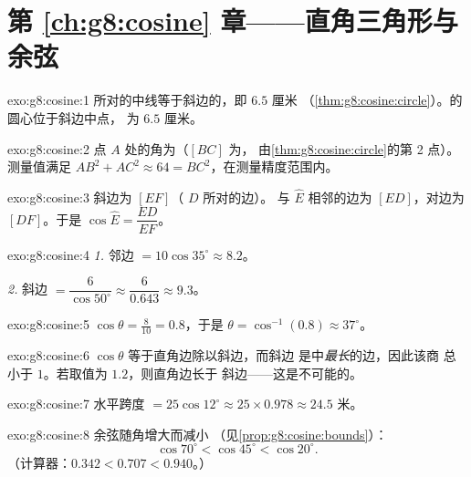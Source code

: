 \section*{第 \ref{ch:g8:cosine} 章——直角三角形与余弦}

\begin{solution}{exo:g8:cosine:1}
所对的中线等于斜边的，即 $6.5$ 厘米
（\cref{thm:g8:cosine:circle}）。的圆心位于斜边中点，
为 $6.5$ 厘米。
\end{solution}

\begin{solution}{exo:g8:cosine:2}
点 $A$ 处的角为（$[BC]$ 为，
由\cref{thm:g8:cosine:circle}的第 2 点）。测量值满足
$AB^2 + AC^2 \approx 64 = BC^2$，在测量精度范围内。
\end{solution}

\begin{solution}{exo:g8:cosine:3}
斜边为 $[EF]$（ $D$ 所对的边）。
与 $\widehat E$ 相邻的边为 $[ED]$，对边为 $[DF]$。于是
$\cos\widehat E = \dfrac{ED}{EF}$。
\end{solution}

\begin{solution}{exo:g8:cosine:4}
\emph{1.} 邻边 $= 10 \cos 35^\circ \approx 8.2$。

\emph{2.} 斜边 $= \dfrac{6}{\cos 50^\circ} \approx
\dfrac{6}{0.643} \approx 9.3$。
\end{solution}

\begin{solution}{exo:g8:cosine:5}
$\cos\theta = \frac{8}{10} = 0.8$，于是
$\theta = \cos^{-1}(0.8) \approx 37^\circ$。
\end{solution}

\begin{solution}{exo:g8:cosine:6}
$\cos\theta$ 等于直角边除以斜边，而斜边
是中\emph{最长}的边，因此该商
总小于 $1$。若取值为 $1.2$，则直角边长于
斜边——这是不可能的。
\end{solution}

\begin{solution}{exo:g8:cosine:7}
水平跨度 $= 25 \cos 12^\circ \approx 25 \times 0.978 \approx
24.5$ 米。
\end{solution}

\begin{solution}{exo:g8:cosine:8}
余弦随角增大而减小
（见\cref{prop:g8:cosine:bounds}）：
\[
\cos 70^\circ < \cos 45^\circ < \cos 20^\circ .
\]
（计算器：$0.342 < 0.707 < 0.940$。）
\end{solution}

